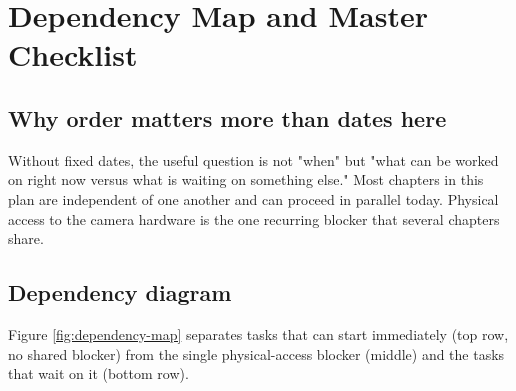 \chapter{Dependency Map and Master Checklist}
\label{chap:dependencies}

\section{Why order matters more than dates here}

Without fixed dates, the useful question is not "when" but "what can be worked on right now versus what is waiting on something else." Most chapters in this plan are independent of one another and can proceed in parallel today. Physical access to the camera hardware is the one recurring blocker that several chapters share.

\section{Dependency diagram}

Figure \ref{fig:dependency-map} separates tasks that can start immediately (top row, no shared blocker) from the single physical-access blocker (middle) and the tasks that wait on it (bottom row).

